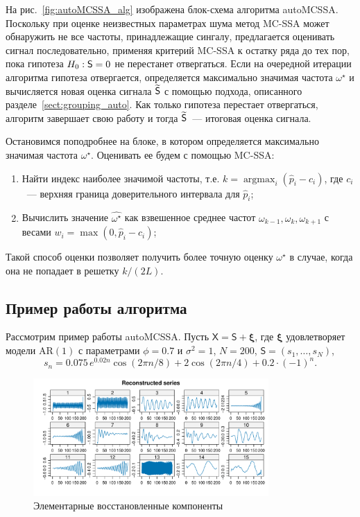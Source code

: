 \documentclass[specialist,
substylefile = spbu_report.rtx,
subf,href,colorlinks=true, 12pt]{disser}
\theoremstyle{definition}
\begin{document}
На рис.~\ref{fig:autoMCSSA_alg} изображена блок-схема алгоритма autoMCSSA. Поскольку при оценке неизвестных параметрах шума метод MC-SSA может обнаружить не все частоты, принадлежащие сингалу, предлагается оценивать сигнал последовательно, применяя критерий MC-SSA к остатку ряда до тех пор, пока гипотеза $H_0:\mathsf{S}=0$ не перестанет отвергаться. Если на очередной итерации алгоритма гипотеза отвергается, определяется максимально значимая частота $\omega^\star$ и вычисляется новая оценка сигнала $\widetilde{\mathsf{S}}$ с помощью подхода, описанного разделе~\ref{sect:grouping_auto}. Как только гипотеза перестает отвергаться, алгоритм завершает свою работу и тогда $\widetilde{\mathsf{S}}$~--- итоговая оценка сигнала.

Остановимся поподробнее на блоке, в котором определяется максимально значимая частота $\omega^\star$. Оценивать ее будем с помощью MC-SSA:
\begin{enumerate}
	\item Найти индекс наиболее значимой частоты, т.е. $k=\operatorname{argmax}_i(\widehat{p}_i-c_i)$, где $c_i$~--- верхняя граница доверительного интервала для $\widehat{p}_i$;
	\item Вычислить значение $\widehat{\omega^\star}$ как взвешенное среднее частот $\omega_{k-1}, \omega_k,\omega_{k+1}$ с весами $w_i=\max(0, \widehat{p}_i-c_i)$;
\end{enumerate}
Такой способ оценки позволяет получить более точную оценку $\omega^\star$ в случае, когда она не попадает в решетку $k/(2L)$.

\subsection{Пример работы алгоритма}\label{sect:autoMCSSA_example}

Рассмотрим пример работы autoMCSSA. Пусть $\mathsf{X}=\mathsf{S}+\bm{\xi}$, где $\bm\xi$ удовлетворяет модели AR$(1)$ с параметрами $\phi=0.7$ и $\sigma^2=1$, $N=200$, $\mathsf{S}=(s_1,\ldots, s_N)$,
\[
	s_n=0.075\, e^{0.02n}\cos(2\pi n/8) + 2\cos(2\pi n / 4) + 0.2\cdot(-1)^n.
\]

\begin{figure}[!h]
	\centering
	\includegraphics[width=0.8\textwidth]{img/reconstructed_ts.pdf}
	\caption{Элементарные восстановленные компоненты}
	\label{fig:reconstructed_ts}
\end{figure}
\end{document}
